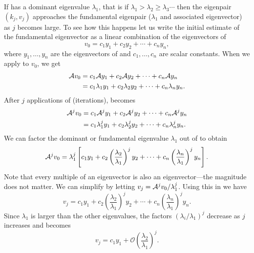 If \A{} has a dominant eigenvalue $\lambda_1$, that is if $\lambda_1 > \lambda_2 \geq \lambda_3 \cdots $ then the eigenpair $\left(k_j, v_j\right)$ approaches the fundamental eigenpair ($\lambda_1$ and associated eigenvector) as $j$ becomes large.  To see how this happens let us write the initial estimate of the fundamental eigenvector as a linear combination of the eigenvectors of \A
\begin{equation}
    v_0 = c_1y_1 + c_2y_2 + \cdots + c_ny_n,
    \label{eq:PowerStartingVector}
\end{equation}
where $y_1, \ldots, y_n$ are the eigenvectors of \A{} and $c_1, \ldots, c_n$ are scalar constants.  When we apply \A{} to $v_0$, we get
\begin{equation}\begin{split}
    \mathcal{A} v_0 &= c_1\mathcal{A} y_1 + c_2\mathcal{A} y_2 + \cdots + c_n\mathcal{A} y_n \\
     &= c_1\lambda_1y_1 + c_2\lambda_2y_2 + \cdots + c_n\lambda_ny_n.
    \label{eq:FirstApplicationofA}
\end{split}\end{equation}
After $j$ applications of \A{} (iterations),  becomes
\begin{equation}\begin{split}
    \mathcal{A}^j v_0 &= c_1\mathcal{A}^j y_1 + c_2\mathcal{A}^j y_2 + \cdots + c_n\mathcal{A}^j y_n \\
     &= c_1\lambda_1^jy_1 + c_2\lambda_2^jy_2 + \cdots + c_n\lambda_n^jy_n.
    \label{eq:jthApplicationofA}
\end{split}\end{equation}
We can factor the dominant or fundamental eigenvalue $\lambda_1$ out of  to obtain
\begin{equation}
    \mathcal{A}^j v_0 = \lambda_1^j\left[c_1y_1 + c_2\left(\frac{\lambda_2}{\lambda_1}\right)^jy_2 + \cdots + c_n\left(\frac{\lambda_n}{\lambda_1}\right)^jy_n\right].
    \label{eq:Factorl_1}
\end{equation}
Note that every multiple of an eigenvector is also an eigenvector---the magnitude does not matter.  We can simplify  by letting $v_j = \mathcal{A}^jv_0/\lambda_1^j$.  Using this in  we have
\begin{equation}
    v_j = c_1y_1 + c_2\left(\frac{\lambda_2}{\lambda_1}\right)^jy_2 + \cdots + c_n\left(\frac{\lambda_n}{\lambda_1}\right)^jy_n.
    \label{eq:Simplified}
\end{equation}
Since $\lambda_1$ is larger than the other eigenvalues, the factors $\left(\lambda_i/\lambda_1\right)^j$ decrease as $j$ increases and  becomes
\begin{equation}
    v_j = c_1y_1 + \mathcal{O}\left(\frac{\lambda_2}{\lambda_1}\right)^j.
    \label{eq:FinalPowerFundamental}
\end{equation}

